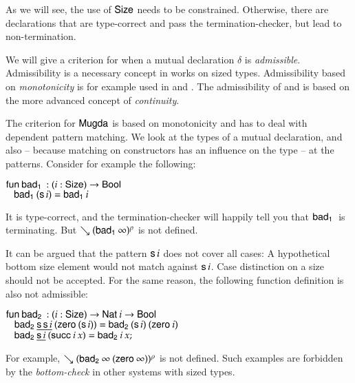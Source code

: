 As we will see, the use of $\mathsf{Size}$ needs to be constrained.
Otherwise, there are declarations that are type-correct and pass the termination-checker, but lead to non-termination.

We will give a criterion for when a mutual declaration $\delta$ is \emph{admissible}.
Admissibility is a necessary concept in works on sized types.
Admissibility based on \emph{monotonicity} is for example used in \cite{bgp:lpar06} and \cite{blanqui04typebased}.
The admissibility of \cite{abel:PhD} and \cite{hughes96proving} is based on the more advanced concept of \emph{continuity}.

The criterion for $\textsf{Mugda}$ is based on monotonicity and has to deal with dependent pattern matching. 
We look at the types of a mutual declaration, and also -- because matching on constructors has an influence on the type -- at the patterns. Consider for example the following:
\begin{bsp}
$\mathsf{fun}\: \mathsf{bad_1}\: : ( i : \mathsf{Size} ) \rightarrow{\mathsf{Bool}}$\\
$\hspace*{3mm} \mathsf{bad_1}\: (\mathsf{s}\, i) = \mathsf{bad_1}\: i $ 
\end{bsp}
It is type-correct, and the termination-checker will happily tell you that $\mathsf{bad_1}\:$ is terminating.
But $\searrow (\mathsf{bad_1}\: \infty)^{\rho}$ is not defined.

It can be argued that the pattern $\mathsf{s}\, i$ does not cover all cases: A hypothetical bottom size element would not match against $\mathsf{s}\, i$. Case distinction on a size should not be accepted.
For the same reason, the following function definition is also not admissible:
\begin{bsp}
$\mathsf{fun}\: \mathsf{bad_2}\: : ( i : \mathsf{Size} ) \rightarrow{\mathsf{Nat}\:i \rightarrow\mathsf{Bool}}$\\
$\hspace*{3mm} \mathsf{bad_2}\: \underline{\mathsf{s}\, \mathsf{s}\, i} \: (\mathsf{zero}\: (\mathsf{s}\, i)) = \mathsf{bad_2}\: (\mathsf{s}\, i) \: (\mathsf{zero}\: i)$\\
$\hspace*{3mm} \mathsf{bad_2}\: \underline{\mathsf{s}\, i}\: (\mathsf{succ}\: i \: x) = \mathsf{bad_2}\: i \: x;$
\end{bsp}
For example, $\searrow (\mathsf{bad_2}\: \infty \: (\mathsf{zero}\: \infty))^{\rho}$ is not defined.
Such examples are forbidden by the \emph{bottom-check} \cite{hughes96proving} in other systems with sized types.

